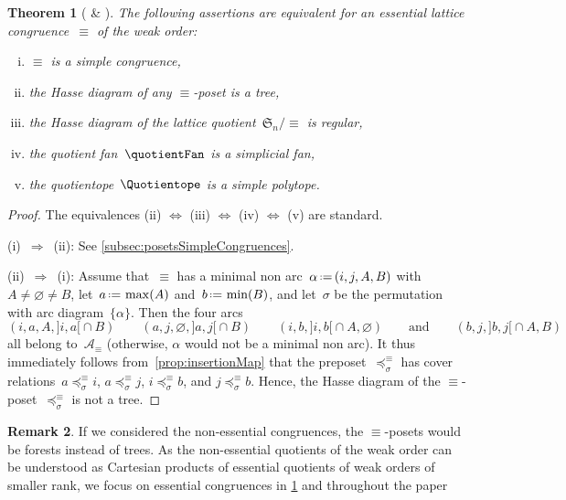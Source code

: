 \documentclass{amsart}
\newtheorem{theorem}{Theorem}[section]
\theoremstyle{definition}
\newtheorem{remark}[theorem]{Remark}
\newcommand{\f}[1]{{\mathfrak{#1}}} %
\newcommand{\eqdef}{\mbox{\,\raisebox{0.2ex}{\scriptsize\ensuremath{\mathrm:}}\ensuremath{=}\,}} %
\newcommand{\arcs}{{\mathcal{A}}} %
\begin{document}
\begin{theorem}[{\cite[Sect.~4.4]{HoangMutze} \& \cite[Sect.~6.3]{DemonetIyamaReadingReitenThomas}}]
\label{thm:simpleCongruences}
The following assertions are equivalent for an essential lattice congruence~$\equiv$ of the weak order:
\begin{enumerate}[(i)]
\item $\equiv$ is a simple congruence,
\item the Hasse diagram of any $\equiv$-poset is a tree,
\item the Hasse diagram of the lattice quotient~$\f{S}_n/{\equiv}$ is regular,
\item the quotient fan~$\quotientFan$ is a simplicial fan,
\item the quotientope~$\Quotientope$ is a simple polytope.
\end{enumerate}
\end{theorem}

\begin{proof}
The equivalences (ii) $\iff$ (iii) $\iff$ (iv) $\iff$ (v) are standard.

(i)~$\Longrightarrow$~(ii): See \cref{subsec:posetsSimpleCongruences}.

(ii)~$\Longrightarrow$~(i): Assume that~$\equiv$ has a minimal non arc~$\alpha \eqdef (i, j, A, B)$ with~$A \ne \varnothing \ne B$, let~$a \eqdef \max(A)$ and~$b \eqdef \min(B)$, and let~$\sigma$ be the permutation with arc diagram~$\{\alpha\}$. Then the four arcs
\[
(i, a, A, {]i,a[} \cap B)
\qquad
(a, j, \varnothing, {]a,j[} \cap B)
\qquad
(i, b, {]i,b[} \cap A, \varnothing)
\qquad\text{and}\qquad
(b, j, {]b,j[} \cap A, B)
\]
all belong to~$\arcs_\equiv$ (otherwise, $\alpha$ would not be a minimal non arc).
It thus immediately follows from~\cref{prop:insertionMap} that the preposet~$\preccurlyeq_\sigma^\equiv$ has cover relations~$a \preccurlyeq_\sigma^\equiv i$, $a \preccurlyeq_\sigma^\equiv j$, $i \preccurlyeq_\sigma^\equiv b$, and $j \preccurlyeq_\sigma^\equiv b$.
Hence, the Hasse diagram of the $\equiv$-poset~$\preccurlyeq_\sigma^\equiv$ is not a tree.
\end{proof}

\begin{remark}
If we considered the non-essential congruences, the $\equiv$-posets would be forests instead of trees.
As the non-essential quotients of the weak order can be understood as Cartesian products of essential quotients of weak orders of smaller rank, we focus on essential congruences in \cref{thm:simpleCongruences} and throughout the paper
\end{remark}
\end{document}
